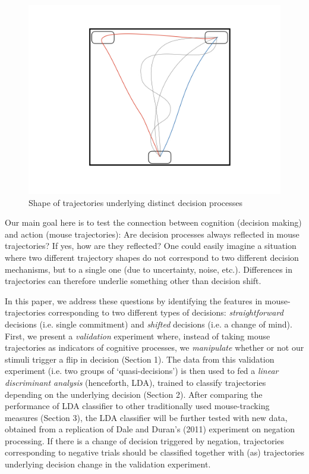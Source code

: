 \documentclass{article}
\begin{document}
\begin{figure}
\centering
\includegraphics[width=\textwidth]{trajectories.jpeg}
\caption{Shape of trajectories underlying distinct decision processes}
\end{figure}

Our main goal here is to test the connection between cognition (decision making) and action (mouse trajectories): Are decision processes always reflected in mouse trajectories? If yes, how are they reflected? 
One could easily imagine a situation where two different trajectory shapes do not correspond to two different decision mechanisms, but to a single one (due to uncertainty, noise, etc.). Differences in trajectories can therefore underlie something other than decision shift. 

In this paper, we address these questions by identifying the features in mouse-trajectories corresponding to two different types of decisions: \emph{straightforward} decisions (i.e. single commitment) and \emph{shifted} decisions (i.e. a change of mind). 
First, we present a \emph{validation} experiment where, instead of taking mouse trajectories as indicators of cognitive processes, we \emph{manipulate} whether or not our stimuli trigger a flip in decision (Section 1). 
The data from this validation experiment (i.e. two groups of `quasi-decisions') is then used to fed a \emph{linear discriminant analysis} (henceforth, LDA), trained to classify trajectories depending on the underlying decision (Section 2). 
After comparing the performance of LDA classifier to other traditionally used mouse-tracking measures (Section 3), 
the LDA classifier will be further tested with new data, obtained from a replication of Dale and Duran's (2011) experiment on negation processing. If there is a change of decision triggered by negation, trajectories corresponding to negative trials should be classified together with (as) trajectories underlying decision change in the validation experiment. 
\end{document}
